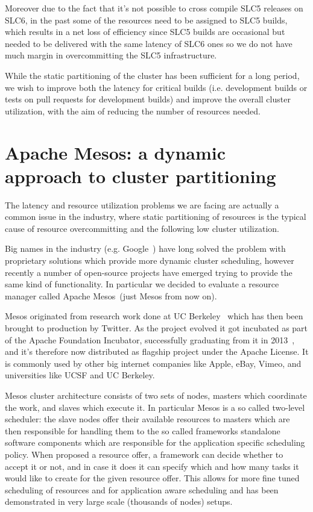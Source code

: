 \documentclass[a4paper]{jpconf}
\begin{document}
Moreover due to the fact that it's not possible to cross compile SLC5 releases
on SLC6, in the past some of the resources need to be assigned to SLC5 builds,
which results in a net loss of efficiency since SLC5 builds are occasional but
needed to be delivered with the same latency of SLC6 ones so we do not have much
margin in overcommitting the SLC5 infrastructure.

While the static partitioning of the cluster has been sufficient for a long
period, we wish to improve both the latency for  critical builds (i.e.
development builds or tests on pull requests for  development builds) and
improve the overall cluster utilization, with the aim  of reducing the number of
resources needed.

\section{Apache Mesos: a dynamic approach to cluster partitioning}

The latency and resource utilization problems we are facing are actually a
common issue in the industry, where static partitioning of resources is the
typical cause of resource overcommitting and the following low cluster
utilization.

Big names in the industry (e.g. Google~\cite{BORG}) have long solved the problem
with proprietary solutions which provide more dynamic cluster scheduling,
however recently a number of open-source projects have emerged trying to provide
the same kind of functionality. In particular we decided to evaluate a resource
manager called Apache Mesos~\cite{MESOS}(just Mesos from now on).

Mesos originated from research work done at UC Berkeley~\cite{MESOSPAPER} which
has then been brought to production by Twitter. As the project evolved it got
incubated as part of the Apache Foundation Incubator, successfully graduating
from it in 2013~\cite{GRADUATION}, and it's therefore now distributed as
flagship project under the Apache License. It is commonly used by other big
internet companies like Apple, eBay, Vimeo, and universities like UCSF and UC
Berkeley.

Mesos cluster architecture consists of two sets of nodes, masters which
coordinate the work, and slaves which execute it. In particular Mesos is a so
called two-level scheduler: the slave nodes offer their available resources to
masters which are then responsible for handling them to the so called frameworks
standalone software components which are responsible for the application
specific scheduling policy. When proposed a resource offer, a framework can
decide whether to accept it or not, and in case it does it can specify which and
how many tasks it would like to create for the given resource offer. This allows
for more fine tuned scheduling of resources and for application aware scheduling
and has been demonstrated in very large scale (thousands of nodes) setups.
\end{document}

